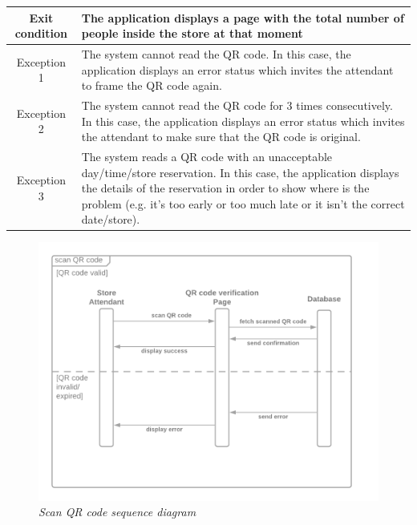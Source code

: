 \documentclass[table, 12pt]{article}
\begin{document}
\begin{longtable}{|c| p{10cm}|}
    \hline
    Exit condition   & The application displays a page with the total number of people inside the store at that moment
    \\
    \hline
    \hline
    Exception 1      & The system cannot read the QR code. In this case, the application displays an error status which invites the attendant to frame the QR code again.                                                                                                                 \\
    \hline
    Exception 2      & The system cannot read the QR code for 3 times consecutively. In this case, the application displays an error status which invites the attendant to make sure that the QR code is original.                                                                        \\
    \hline
    Exception 3      & The system reads a QR code with an unacceptable day/time/store reservation. In this case, the application displays the details of the reservation in order to show where is the problem (e.g. it's too early or too much late or it isn't the correct date/store). \\
    \hline
\end{longtable}



\begin{figure}[H]
    \centering
    \includegraphics[scale=0.38]{assets/scan-QR-code.png}
    \caption{\textit{Scan QR code sequence diagram}}
\end{figure}
\end{document}
